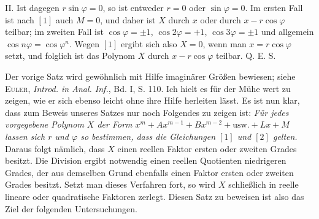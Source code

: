 II. Ist dagegen $r\sin\varphi=0$, so ist entweder $r=0$ oder $\sin\varphi=0$. Im ersten Fall ist nach $[1]$ auch $M=0$, und daher ist $X$ durch $x$ oder durch $x-r\cos\varphi$ teilbar; im zweiten Fall ist $\cos\varphi=\pm1$, $\cos2\varphi=+1$, $\cos3\varphi=\pm1$ und allgemein $\cos n\varphi=\cos\varphi^n$. Wegen $[1]$ ergibt sich also $X=0$, wenn man $x=r\cos\varphi$ setzt, und folglich ist das Polynom $X$ durch $x-r\cos\varphi$ teilbar. Q. E. S.

Der vorige Satz wird gewöhnlich mit Hilfe imaginärer Größen bewiesen; siehe \textsc{Euler}, \textit{Introd. in Anal. Inf.}, Bd. I, S. 110. Ich hielt es für der Mühe wert zu zeigen, wie er sich ebenso leicht ohne ihre Hilfe herleiten lässt. Es ist nun klar, dass zum Beweis unseres Satzes nur noch Folgendes zu zeigen ist: \textit{Für jedes vorgegebene Polynom $X$ der Form $x^m+Ax^{m-1}+Bx^{m-2}+\text{usw.}+Lx+M$ lassen sich $r$ und $\varphi$ so bestimmen, dass die Gleichungen $[1]$ und $[2]$ gelten.} Daraus folgt nämlich, dass $X$ einen reellen Faktor ersten oder zweiten Grades besitzt. Die Division ergibt notwendig einen reellen Quotienten niedrigeren Grades, der aus demselben Grund ebenfalls einen Faktor ersten oder zweiten Grades besitzt. Setzt man dieses Verfahren fort, so wird $X$ schließlich in reelle lineare oder quadratische Faktoren zerlegt. Diesen Satz zu beweisen ist also das Ziel der folgenden Untersuchungen.

